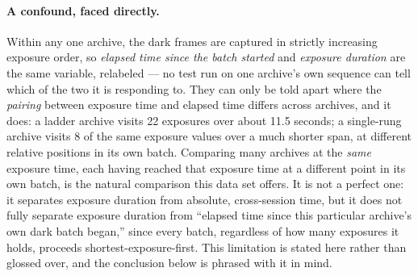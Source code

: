 \documentclass[11pt,a4paper]{article}
\begin{document}
\paragraph{A confound, faced directly.}
Within any one archive, the dark frames are captured in strictly increasing
exposure order, so \emph{elapsed time since the batch started} and
\emph{exposure duration} are the same variable, relabeled --- no test run
on one archive's own sequence can tell which of the two it is responding
to. They can only be told apart where the \emph{pairing} between exposure
time and elapsed time differs across archives, and it does: a ladder
archive visits 22 exposures over about 11.5 seconds; a single-rung archive
visits 8 of the same exposure values over a much shorter span, at different
relative positions in its own batch. Comparing many archives at the
\emph{same} exposure time, each having reached that exposure time at a
different point in its own batch, is the natural comparison this data set
offers. It is not a perfect one: it separates exposure duration from
absolute, cross-session time, but it does not fully separate exposure
duration from ``elapsed time since this particular archive's own dark
batch began,'' since every batch, regardless of how many exposures it
holds, proceeds shortest-exposure-first. This limitation is stated here
rather than glossed over, and the conclusion below is phrased with it in
mind.
\end{document}
